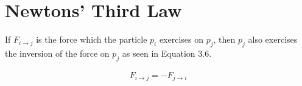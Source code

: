 \documentclass[11pt,
               a4paper,
               bibtotoc,
               idxtotoc,
               headsepline,
               footsepline,
               footexclude,
               BCOR12mm,
               DIV13,
               openany,   %
               ]
               {scrbook}
\begin{document}
                
                
                
                



\section{Newtons' Third Law}

If $F_{i \rightarrow j}$ is the force which the particle $p_i$ exercises on $p_j$, then $p_j$ also exercises the inversion of the force on $p_j$ as seen in Equation 3.6.

\begin{align}
F_{i \rightarrow j} = - F_{j \rightarrow i}
\label{newton-three}
\end{align}
\end{document}
